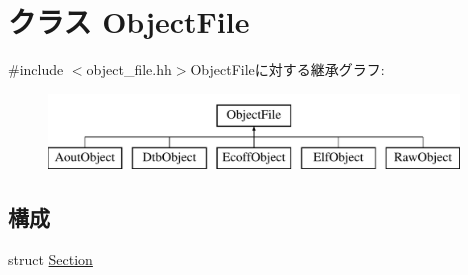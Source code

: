 \hypertarget{classObjectFile}{
\section{クラス ObjectFile}
\label{classObjectFile}
}


{\ttfamily \#include $<$object\_\-file.hh$>$}ObjectFileに対する継承グラフ:\begin{figure}[H]
\begin{center}
\leavevmode
\includegraphics[height=2cm]{classObjectFile}
\end{center}
\end{figure}
\subsection*{構成}
\begin{DoxyCompactItemize}
\item 
struct \hyperlink{structObjectFile_1_1Section}{Section}
\end{DoxyCompactItemize}
